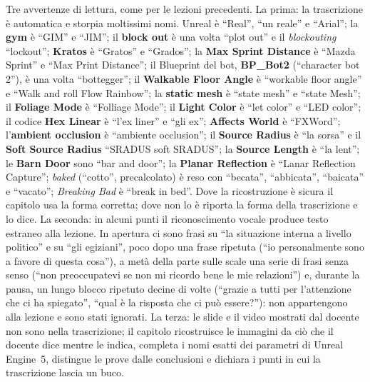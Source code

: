 Tre avvertenze di lettura, come per le lezioni precedenti. La prima: la trascrizione è
automatica e storpia moltissimi nomi. Unreal è ``Real'', ``un reale'' e ``Arial''; la
\textbf{gym} è ``GIM'' e ``JIM''; il \textbf{block out} è una volta ``plot out'' e il
\emph{blockouting} ``lockout''; \textbf{Kratos} è ``Gratos'' e ``Grados''; la
\textbf{Max Sprint Distance} è ``Mazda Sprint'' e ``Max Print Distance''; il Blueprint del
bot, \textbf{BP\_Bot2} (``character bot 2''), è una volta ``bottegger''; il
\textbf{Walkable Floor Angle} è ``workable floor angle'' e ``Walk and roll Flow Rainbow'';
la \textbf{static mesh} è ``state mesh'' e ``state Mesh''; il \textbf{Foliage Mode} è
``Folliage Mode''; il \textbf{Light Color} è ``let color'' e ``LED color''; il codice
\textbf{Hex Linear} è ``l'ex liner'' e ``gli ex''; \textbf{Affects World} è ``FXWord'';
l'\textbf{ambient occlusion} è ``ambiente occlusion''; il \textbf{Source Radius} è ``la
sorsa'' e il \textbf{Soft Source Radius} ``SRADUS soft SRADUS''; la \textbf{Source Length}
è ``la lent''; le \textbf{Barn Door} sono ``bar and door''; la \textbf{Planar Reflection}
è ``Lanar Reflection Capture''; \emph{baked} (``cotto'', precalcolato) è reso con
``becata'', ``abbicata'', ``baicata'' e ``vacato''; \emph{Breaking Bad} è ``break in
bed''. Dove la ricostruzione è sicura il capitolo usa la forma corretta; dove non lo è
riporta la forma della trascrizione e lo dice. La seconda: in alcuni punti il
riconoscimento vocale produce testo estraneo alla lezione. In apertura ci sono frasi su
``la situazione interna a livello politico'' e su ``gli egiziani'', poco dopo una frase
ripetuta (``io personalmente sono a favore di questa cosa''), a metà della parte sulle
scale una serie di frasi senza senso (``non preoccupatevi se non mi ricordo bene le mie
relazioni'') e, durante la pausa, un lungo blocco ripetuto decine di volte (``grazie a
tutti per l'attenzione che ci ha spiegato'', ``qual è la risposta che ci può essere?''):
non appartengono alla lezione e sono stati ignorati. La terza: le slide e il video
mostrati dal docente non sono nella trascrizione; il capitolo ricostruisce le immagini da
ciò che il docente dice mentre le indica, completa i nomi esatti dei parametri di Unreal
Engine~5, distingue le prove dalle conclusioni e dichiara i punti in cui la trascrizione
lascia un buco.

